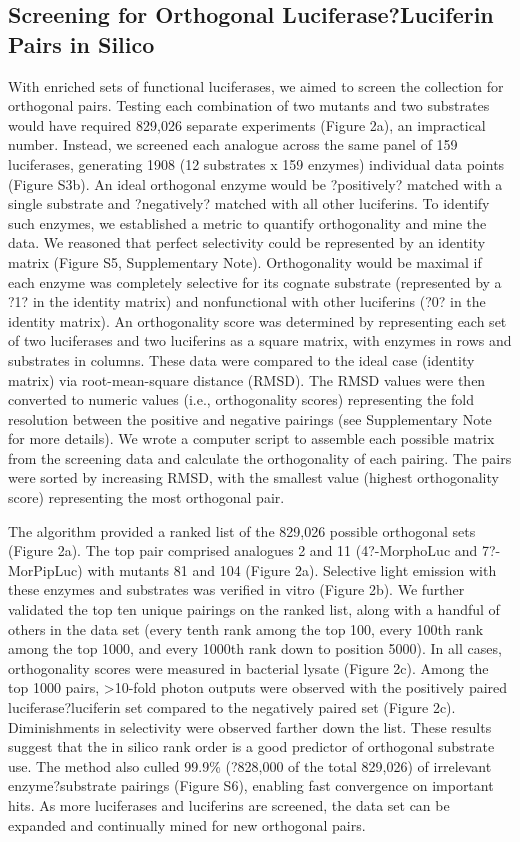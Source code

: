 \subsection*{Screening for Orthogonal Luciferase?Luciferin Pairs in Silico}
With enriched sets of functional luciferases, we aimed to screen the collection for orthogonal pairs. Testing each combination of two mutants and two substrates would have required 829,026 separate experiments (Figure 2a), an impractical number. Instead, we screened each analogue across the same panel of 159 luciferases, generating 1908 (12 substrates x 159 enzymes) individual data points (Figure S3b). An ideal orthogonal enzyme would be ?positively? matched with a single substrate and ?negatively? matched with all other luciferins. To identify such enzymes, we established a metric to quantify orthogonality and mine the data. We reasoned that perfect selectivity could be represented by an identity matrix (Figure S5, Supplementary Note). Orthogonality would be maximal if each enzyme was completely selective for its cognate substrate (represented by a ?1? in the identity matrix) and nonfunctional with other luciferins (?0? in the identity matrix). An orthogonality score was determined by representing each set of two luciferases and two luciferins as a square matrix, with enzymes in rows and substrates in columns. These data were compared to the ideal case (identity matrix) via root-mean-square distance (RMSD). The RMSD values were then converted to numeric values (i.e., orthogonality scores) representing the fold resolution between the positive and negative pairings (see Supplementary Note for more details). We wrote a computer script to assemble each possible matrix from the screening data and calculate the orthogonality of each pairing. The pairs were sorted by increasing RMSD, with the smallest value (highest orthogonality score) representing the most orthogonal pair.
\par
The algorithm provided a ranked list of the 829,026 possible orthogonal sets (Figure 2a). The top pair comprised analogues 2 and 11 (4?-MorphoLuc and 7?-MorPipLuc) with mutants 81 and 104 (Figure 2a). Selective light emission with these enzymes and substrates was verified in vitro (Figure 2b). We further validated the top ten unique pairings on the ranked list, along with a handful of others in the data set (every tenth rank among the top 100, every 100th rank among the top 1000, and every 1000th rank down to position 5000). In all cases, orthogonality scores were measured in bacterial lysate (Figure 2c). Among the top 1000 pairs, >10-fold photon outputs were observed with the positively paired luciferase?luciferin set compared to the negatively paired set (Figure 2c). Diminishments in selectivity were observed farther down the list. These results suggest that the in silico rank order is a good predictor of orthogonal substrate use. The method also culled 99.9\% (?828,000 of the total 829,026) of irrelevant enzyme?substrate pairings (Figure S6), enabling fast convergence on important hits. As more luciferases and luciferins are screened, the data set can be expanded and continually mined for new orthogonal pairs.

